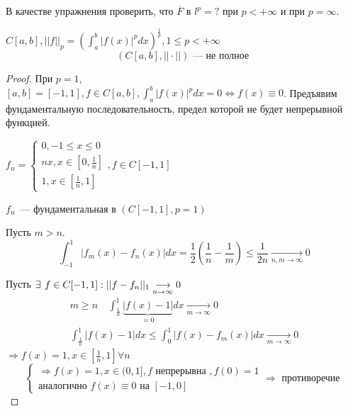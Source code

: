 \documentclass[document]{subfiles}
\begin{document}
В качестве упражнения проверить, что $\overline{F}$ в $l^p = ? $ при $p < + \infty$ и при $p = \infty$.
\begin{theorem}
    $C[a,b], ||f||_p = \left( \int^b_a |f(x)|^p dx \right)^{\frac{1}{p}}, 1 \leq p < + \infty$
    \[ (C[a,b], || \cdot || ) \text {~--- не полное } \]
\end{theorem}
\begin{proof}
    При $p = 1$, $[a,b] = [-1,1], f \in C[a,b], \int^b_a |f(x)|^p dx = 0 \Leftrightarrow f(x) \equiv 0$.
    Предъявим фундаментальную последовательность, предел которой не будет непрерывной функцией.

    $f_n = \begin{cases}
        0, -1 \leq x \leq 0 \\
        nx, x \in [0, \frac{1}{n}] \\
        1, x \in [\frac{1}{n}, 1]
    \end{cases}, f \in C[-1,1]$ %

    $f_n$~--- фундаментальная в $(C[-1,1], p=1)$

    Пусть $ m > n$. %
    \[ \int_{-1}^1 |f_m(x) - f_n(x)| dx = \frac{1}{2} \left( \frac{1}{n} - \frac{1}{m} \right) \leq \frac{1}{2n} \underset{n, m \to \infty}{\longrightarrow} 0 \]

    Пусть $\exists \, f \in C[-1,1] : \normunder{f-f_n}{1} \underset{n \to \infty}{\longrightarrow} 0$ 
    \begin{gather*}
        m \geq n \quad \int^1_{\frac{1}{n}} \underbrace{|f(x) - 1|}_{=0} dx  \underset{m \to \infty}{\longrightarrow} 0  \\
        \int^1_{\frac{1}{n}} {|f(x) - 1|} dx \leq \int^1_0 |f(x) - f_m(x)|dx \underset{m \to \infty}{\longrightarrow} 0
    \end{gather*}
    $\Rightarrow f(x) = 1, x \in \left[ \frac{1}{n}, 1 \right] \forall n $\\
    \[ \begin{cases}
       \Rightarrow f(x) = 1, x \in (0,1], f \text{ непрерывна }, f(0) = 1\\
        \text{аналогично } f(x) \equiv 0 \text{ на } [-1,0]
    \end{cases} \Rightarrow \text{ противоречие } \]
\end{proof}
\end{document}
